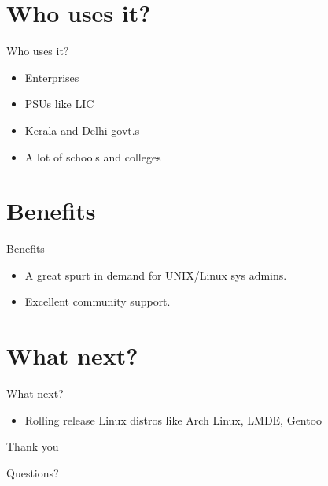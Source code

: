 \documentclass{beamer}
\begin{document}
 \section{Who uses it?}
 \begin{frame}{Who uses it?}
  \begin{itemize}
   \item Enterprises
   \pause
   \item PSUs like LIC
   \pause
   \item Kerala and Delhi govt.s
   \pause
   \item A lot of schools and colleges
  \end{itemize}
 \end{frame}

 \section{Benefits}
 \begin{frame}{Benefits}
  \begin{itemize}
   \item A great spurt in demand for UNIX/Linux sys admins.
   \pause
   \item Excellent community support.
  \end{itemize}

 \end{frame}

 \section{What next?}
 \begin{frame}{What next?}
  \begin{itemize}
   \item Rolling release Linux distros like Arch Linux, LMDE, Gentoo
  \end{itemize}
 \end{frame}

 \begin{frame}{Thank you}
  \begin{center}
   \LARGE{Questions?}
  \end{center}
 \end{frame}
\end{document}

